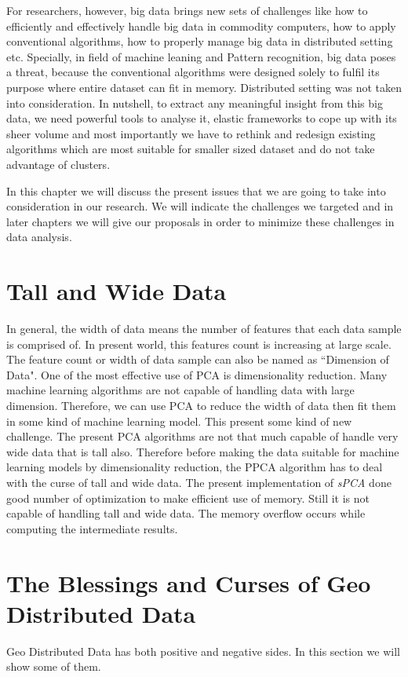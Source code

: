 \documentclass[12pt,notitlepage,oneside]{report}
\begin{document}
For researchers, however, big data brings new sets of challenges like how to efficiently and
effectively handle big data in commodity computers, how to apply conventional algorithms, how
to properly manage big data in distributed setting etc. Specially, in field of machine leaning and
Pattern recognition, big data poses a threat, because the conventional algorithms were designed
solely to fulfil its purpose where entire dataset can fit in memory. Distributed setting was not
taken into consideration. In nutshell, to extract any meaningful insight from this big data, we
need powerful tools to analyse it, elastic frameworks to cope up with its sheer volume and most
importantly we have to rethink and redesign existing algorithms which are most suitable for
smaller sized dataset and do not take advantage of clusters.

In this chapter we will discuss the present issues that we are going to take into consideration in our research. We will indicate the challenges we targeted and in later chapters we will give our proposals in order to minimize these challenges in data analysis.
\section{Tall and Wide Data}
In general, the width of data means the number of features that each data sample is comprised of. In present world, this features count is increasing at large scale. The feature count or width of data sample can also be named as ``Dimension of Data". One of the most effective use of PCA is dimensionality reduction. Many machine learning algorithms are not capable of handling data with large dimension. Therefore, we can use PCA to reduce the width of data then fit them in some kind of machine learning model. This present some kind of new challenge. The present PCA algorithms are not that much capable of handle very wide data that is tall also. Therefore before making the data suitable for machine learning models by dimensionality reduction, the PPCA algorithm has to deal with the curse of tall and wide data. The present implementation of \textit{sPCA} done good number of optimization to make efficient use of memory. Still it is not capable of handling tall and wide data. The memory overflow occurs while computing the intermediate results. 
\section{The Blessings and Curses of Geo Distributed Data}
Geo Distributed Data has both positive and negative sides. In this section we will show some of them.
\end{document}
